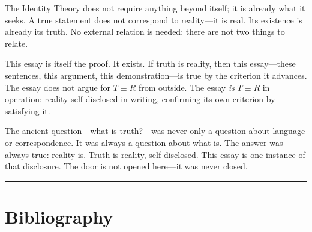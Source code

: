 \documentclass[11pt, oneside]{article}
\begin{document}
The Identity Theory does not require anything beyond itself; it is
already what it seeks. A true statement does not correspond to
reality---it is real. Its existence is already its truth. No external
relation is needed: there are not two things to relate.

This essay is itself the proof. It exists. If truth is reality, then
this essay---these sentences, this argument, this demonstration---is true
by the criterion it advances. The essay does not argue for $T \equiv R$
from outside. The essay \textit{is} $T \equiv R$ in operation: reality
self-disclosed in writing, confirming its own criterion by satisfying it.

The ancient question---what is truth?---was never only a question about
language or correspondence. It was always a question about what is. The
answer was always true: reality is. Truth is reality,
self-disclosed. This essay is one instance of that disclosure. The door
is not opened here---it was never closed.

\vspace{1.5em}
{\color{LogosGray}\centering\rule{0.45\textwidth}{0.4pt}\par}
\vspace{1.5em}


\section*{Bibliography}
\end{document}
